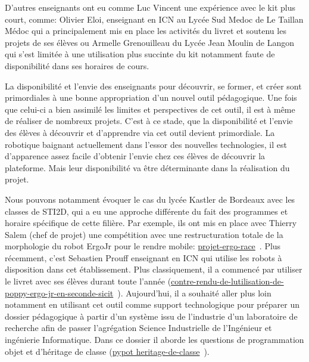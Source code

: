             D'autres enseignants ont eu comme Luc Vincent une expérience avec le kit plus court, comme:
            Olivier Eloi, enseignant en ICN au Lycée Sud Medoc de Le Taillan Médoc qui a principalement mis en place les activités du livret et soutenu les projets de ses élèves ou 
            Armelle Grenouilleau du Lycée Jean Moulin de Langon qui s'est limitée à une utilisation plus succinte du kit notamment faute de disponibilité dans ses horaires de cours.\par%
            La disponibilité et l'envie des enseignants pour découvrir, se former, et créer sont primordiales à une bonne appropriation d'un nouvel outil pédagogique. Une fois que celui-ci a bien assimilé les limites et perspectives de cet outil, il est à même de réaliser de nombreux projets. C'est à ce stade, que la disponibilité et l'envie des élèves à découvrir et d'apprendre via cet outil devient primordiale. 
            La robotique baignant actuellement dans l'essor des nouvelles technologies, il est d'apparence assez facile d'obtenir l'envie chez ces élèves de découvrir la plateforme. Mais leur disponibilité va être déterminante dans la réalisation du projet.\par%
            Nous pouvons notamment évoquer le cas du lycée Kastler de Bordeaux avec les classes de STI2D, qui a eu une approche différente du fait des programmes et horaire spécifique de cette filière. Par exemple, ils ont mis en place avec Thierry Salem (chef de projet) une compétition avec une restructuration totale de la morphologie du robot ErgoJr pour le rendre mobile: \href{https://forum.poppy-project.org/t/lycee-kastler-projet-ergo-race/2026}{projet-ergo-race}~. Plus récemment, c'est Sebastien Prouff enseignant en ICN qui utilise les robots à disposition dans cet établissement. Plus classiquement, il a commencé par utiliser le livret avec ses élèves durant toute l'année (\href{https://forum.poppy-project.org/t/contre-rendu-de-lutilisation-de-poppy-ergo-jr-en-seconde-sicit-base-sur-le-livret-pedagogique-snap-et-ergo-jr/3284}{contre-rendu-de-lutilisation-de-poppy-ergo-jr-en-seconde-sicit}~). Aujourd'hui, il a souhaité aller plus loin notamment en utilisant cet outil comme support technologique pour préparer un dossier pédagogique à partir d'un système issu de l'industrie \etou d'un laboratoire de recherche afin de passer l'agrégation Science Industrielle de l'Ingénieur et ingénierie Informatique. Dans ce dossier il aborde les questions de programmation objet et d'héritage de classe (\href{https://forum.poppy-project.org/t/poppy-heritage-de-classe-python/3778}{pypot heritage-de-classe}~).\par%
